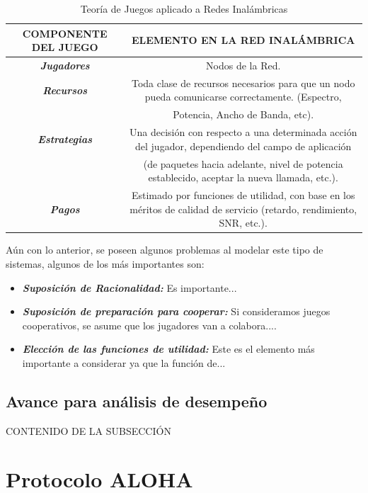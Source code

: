 \documentclass[journal]{IEEEtran}
\begin{document}
\begin{table}[]
\centering
\caption{Teoría de Juegos aplicado a Redes Inalámbricas}
\label{Table_Game_Theory}
\begin{tabular}{|c|c|}
\hline
\textbf{COMPONENTE DEL JUEGO} & \textbf{ELEMENTO EN LA RED INALÁMBRICA}       \\ \hline
\textit{\textbf{Jugadores}}   & Nodos de la Red.                              \\ \hline
\textit{\textbf{Recursos}}    & Toda clase de recursos necesarios para que un nodo pueda comunicarse correctamente. (Espectro, 
\\
& Potencia, Ancho de Banda, etc).
\\ \hline
\textit{\textbf{Estrategias}} & Una decisión con respecto a una determinada acción del jugador, dependiendo del campo de aplicación
\\ 
& (de paquetes hacia adelante, nivel de potencia establecido, aceptar la nueva llamada, etc.). 
\\ \hline
\textit{\textbf{Pagos}}       & Estimado por funciones de utilidad, con base en los méritos de calidad de servicio (retardo, rendimiento, SNR, etc.).
\\ \hline
\end{tabular}
\end{table}

Aún con lo anterior, se poseen algunos problemas al modelar este tipo de sistemas, algunos de los más importantes son:

\begin{itemize}
    \item \textit{\textbf{Suposición de Racionalidad:}} Es importante...
    \item \textit{\textbf{Suposición de preparación para cooperar:}} Si consideramos juegos cooperativos, se asume que los jugadores van a colabora....
    \item \textit{\textbf{Elección de las funciones de utilidad:}} Este es el elemento más importante a considerar ya que la función de...
\end{itemize}

\subsection{Avance para análisis de desempeño}

CONTENIDO DE LA SUBSECCIÓN

\section{Protocolo ALOHA}
\end{document}
